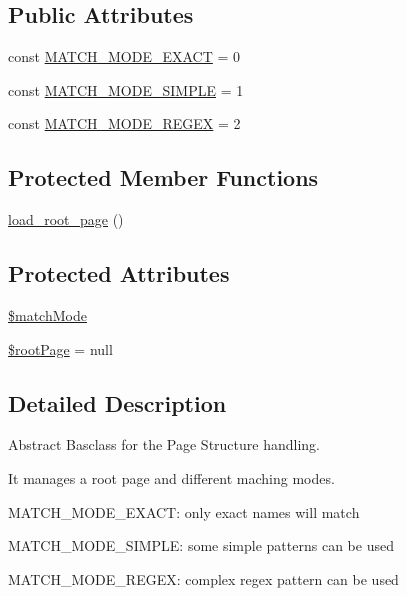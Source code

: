 \subsection*{Public Attributes}
\begin{DoxyCompactItemize}
\item 
const \hyperlink{classWEPPO_1_1Routing_1_1PageStructure_acd456b36874bf5f113861b18edffa052}{M\+A\+T\+C\+H\+\_\+\+M\+O\+D\+E\+\_\+\+E\+X\+A\+CT} = 0
\item 
const \hyperlink{classWEPPO_1_1Routing_1_1PageStructure_a52f371b7de8e41c5e7f78d0ce73ff047}{M\+A\+T\+C\+H\+\_\+\+M\+O\+D\+E\+\_\+\+S\+I\+M\+P\+LE} = 1
\item 
const \hyperlink{classWEPPO_1_1Routing_1_1PageStructure_a1ebae2430cd701d5b5c877b3c5b6c5f0}{M\+A\+T\+C\+H\+\_\+\+M\+O\+D\+E\+\_\+\+R\+E\+G\+EX} = 2
\end{DoxyCompactItemize}
\subsection*{Protected Member Functions}
\begin{DoxyCompactItemize}
\item 
\hyperlink{classWEPPO_1_1Routing_1_1PageStructure_aa924cdcb6b4c303ba4eff0a95bd59f52}{load\+\_\+root\+\_\+page} ()
\end{DoxyCompactItemize}
\subsection*{Protected Attributes}
\begin{DoxyCompactItemize}
\item 
\hyperlink{classWEPPO_1_1Routing_1_1PageStructure_aadefa7828669140f8ba751beecba02e4}{\$match\+Mode}
\item 
\hyperlink{classWEPPO_1_1Routing_1_1PageStructure_a2ca8856124b59fc74746ac83440a4afc}{\$root\+Page} = null
\end{DoxyCompactItemize}


\subsection{Detailed Description}
Abstract Basclass for the Page Structure handling.

It manages a root page and different maching modes.
\begin{DoxyItemize}
\item M\+A\+T\+C\+H\+\_\+\+M\+O\+D\+E\+\_\+\+E\+X\+A\+CT\+: only exact names will match
\item M\+A\+T\+C\+H\+\_\+\+M\+O\+D\+E\+\_\+\+S\+I\+M\+P\+LE\+: some simple patterns can be used
\item M\+A\+T\+C\+H\+\_\+\+M\+O\+D\+E\+\_\+\+R\+E\+G\+EX\+: complex regex pattern can be used
\end{DoxyItemize}

